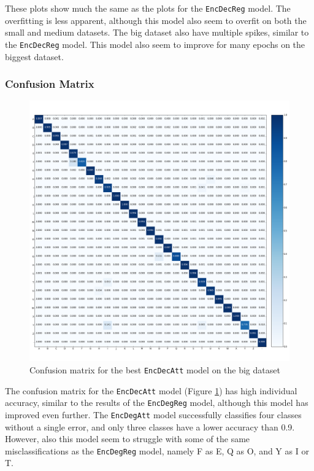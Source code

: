 These plots show much the same as the plots for the {\tt EncDecReg} model. The overfitting is less apparent, although this model also seem to overfit on both the small and medium datasets. The big dataset also have multiple spikes, similar to the {\tt EncDecReg} model. This model also seem to improve for many epochs on the biggest dataset.

\newpage
\subsubsection{Confusion Matrix}
\begin{figure}[H]
    \centering
    \includegraphics[width=1\textwidth]{fig/results/experiment1/big/encdecatt/confusion_matrix.png}
    \caption{Confusion matrix for the best {\tt EncDecAtt} model on the big dataset}
    \label{fig:result1_big_encdecatt_confusion_matrix}
\end{figure}

The confusion matrix for the {\tt EncDecAtt} model (Figure \ref{fig:result1_big_encdecatt_confusion_matrix}) has high individual accuracy, similar to the results of the {\tt EncDegReg} model, although this model has improved even further. The {\tt EncDegAtt} model successfully classifies four classes without a single error, and only three classes have a lower accuracy than 0.9. However, also this model seem to struggle with some of the same misclassifications as the {\tt EncDegReg} model, namely F as E, Q as O, and Y as I or T.

